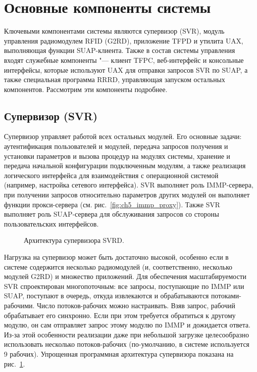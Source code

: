 \section{Основные компоненты системы}\label{sec:ch5_components}

Ключевыми компонентами системы являются супервизор (SVR), модуль управления радиомодулем RFID (G2RD), приложение TFPD и утилита UAX, выполняющая функции SUAP-клиента. Также в состав системы управления входят служебные компоненты "--- клиент TFPC, веб-интерфейс и консольные интерфейсы, которые используют UAX для отправки запросов SVR по SUAP, а также специальная программа RRRD, управляющая запуском остальных компонентов. Рассмотрим эти компоненты подробнее.


\subsection{Супервизор (SVR)}\label{sec:ch5_components_svr}

Супервизор управляет работой всех остальных модулей. Его основные задачи: аутентификация пользователей и модулей, передача запросов получения и установки параметров и вызова процедур на модулях системы, хранение и передача начальной конфигурации подключенным модулям, а также реализация логического интерфейса для взаимодействия с операционной системой (например, настройка сетевого интерфейса). SVR выполняет роль IMMP-сервера, при получении запросов относительно параметров других модулей он выполняет функции прокси-сервера (см. рис.~\ref{fig:ch5_immp_proxy}). Также SVR выполняет роль SUAP-сервера для обслуживания запросов со стороны пользовательских интерфейсов.

\begin{figure}[ht]
  \caption{Архитектура супервизора SVRD.}
  \label{fig:ch5_svrd_threads}
\end{figure}

Нагрузка на супервизор может быть достаточно высокой, особенно если в системе содержится несколько радиомодулей (и, соответственно, несколько модулей G2RD) и множество приложений. Для обеспечения масштабируемости SVR спроектирован многопоточным: все запросы, поступающие по IMMP или SUAP, поступают в очередь, откуда извлекаются и обрабатываются потоками-рабочими. Число потоков-рабочих можно настраивать. Взяв запрос, рабочий обрабатывает его синхронно. Если при этом требуется обратиться к другому модулю, он сам отправляет запрос этому модулю по IMMP и дожидается ответа. Из-за этой особенности реализации даже при небольшой загрузке целесообразно использовать несколько потоков-рабочих (по-умолчанию, в системе используется 9 рабочих). Упрощенная программная архитектура супервизора показана на рис.~\ref{fig:ch5_svrd_threads}.

